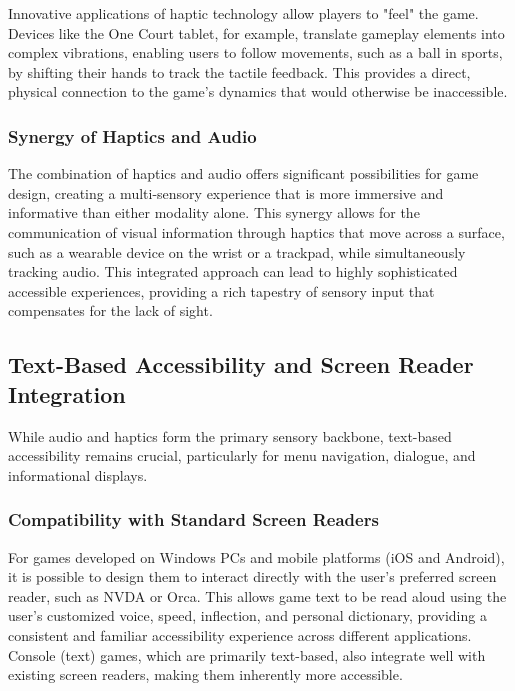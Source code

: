Innovative applications of haptic technology allow players to "feel" the game. Devices like the One Court tablet, for example, translate gameplay elements into complex vibrations, enabling users to follow movements, such as a ball in sports, by shifting their hands to track the tactile feedback\supercite{YouTubeHaptic}. This provides a direct, physical connection to the game's dynamics that would otherwise be inaccessible.

\subsubsection{Synergy of Haptics and Audio}

The combination of haptics and audio offers significant possibilities for game design, creating a multi-sensory experience that is more immersive and informative than either modality alone\supercite{LighthouseGuild2025}. This synergy allows for the communication of visual information through haptics that move across a surface, such as a wearable device on the wrist or a trackpad, while simultaneously tracking audio\supercite{LighthouseGuild2025}. This integrated approach can lead to highly sophisticated accessible experiences, providing a rich tapestry of sensory input that compensates for the lack of sight.

\subsection{Text-Based Accessibility and Screen Reader Integration}

While audio and haptics form the primary sensory backbone, text-based accessibility remains crucial, particularly for menu navigation, dialogue, and informational displays.

\subsubsection{Compatibility with Standard Screen Readers}

For games developed on Windows PCs and mobile platforms (iOS and Android), it is possible to design them to interact directly with the user's preferred screen reader, such as NVDA or Orca\supercite{AFBIntroVG}. This allows game text to be read aloud using the user's customized voice, speed, inflection, and personal dictionary, providing a consistent and familiar accessibility experience across different applications\supercite{AFBIntroVG}. Console (text) games, which are primarily text-based, also integrate well with existing screen readers, making them inherently more accessible\supercite{GitHubGameEngines}.

